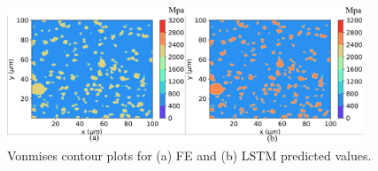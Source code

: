 \begin{figure}[!h]
    \centering
	\includegraphics[width=0.95\textwidth]{Pictures/lstm-res/vonmises_bitmap-units.png}
	\hspace{1mm}
	\caption{Vonmises contour plots for (a) FE and (b) LSTM predicted values.} 
	\label{fig:vonmises_bitmap}
\end{figure}